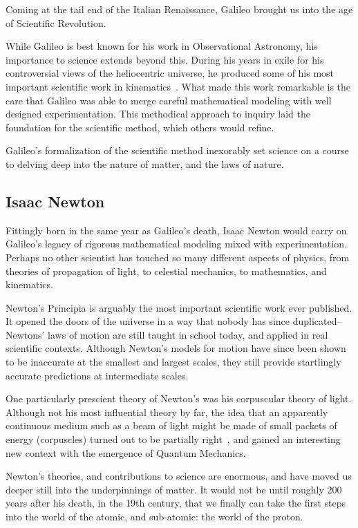 Coming at the tail end of the Italian Renaissance, Galileo brought us into the
age of Scientific Revolution.

While Galileo is best known for his work in Observational Astronomy, his
importance to science extends beyond this. During his years in exile for his
controversial views of the heliocentric universe, he produced some of his most
important scientific work in kinematics~\cite{Hall1965}. What made this work
remarkable is the care that Galileo was able to merge careful mathematical
modeling with well designed experimentation. This methodical approach to inquiry
laid the foundation for the scientific method, which others would refine. 

Galileo's formalization of the scientific method inexorably set science on a
course to delving deep into the nature of matter, and the laws of nature.

\subsection{Isaac Newton}
Fittingly born in the same year as Galileo's death, Isaac Newton would carry on
Galileo's legacy of rigorous mathematical modeling mixed with experimentation.
Perhaps no other scientist has touched so many different aspects of physics,
from theories of propagation of light, to celestial mechanics, to mathematics,
and kinematics.

Newton's Principia is arguably the most important scientific work ever
published.  It opened the doors of the universe in a way that nobody has since
duplicated--Newtons' laws of motion are still taught in school today, and
applied in real scientific contexts. Although Newton's models for motion have
since been shown to be inaccurate at the smallest and largest scales, they still
provide startlingly accurate predictions at intermediate scales.

One particularly prescient theory of Newton's was his corpuscular theory of
light. Although not his most influential theory by far, the idea that an
apparently continuous medium such as a beam of light might be made of small
packets of energy (corpuscles) turned out to be partially
right~\cite{Stuewer1970}, and gained an interesting new context with the
emergence of Quantum Mechanics.

Newton's theories, and contributions to science are enormous, and have moved us
deeper still into the underpinnings of matter. It would not be until roughly 200
years after his death, in the 19th century, that we finally can take the first
steps into the world of the atomic, and sub-atomic: the world of the proton. 

